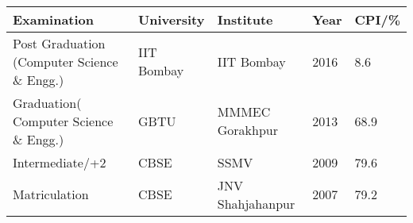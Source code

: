  \hfill \\[-0.1cm]
\indent \begin{tabular}{@{\hskip 0.04in} l @{\hskip 0.40in} l @{\hskip 0.30in} l @{\hskip 0.30in} l @{\hskip 0.27in} l }
	\hline
	\textbf{Examination} & \textbf{University} & \textbf{Institute} & \textbf{Year} & \textbf{CPI/\%} \\
	\hline
	Post Graduation (Computer Science \& Engg.) & IIT Bombay & IIT Bombay & 2016 & 8.6 \\
	Graduation( Computer Science \& Engg.) & GBTU & MMMEC Gorakhpur & 2013 & 68.9\\
	Intermediate/+2 & CBSE & SSMV & 2009 & 79.6\\
	Matriculation & CBSE & JNV Shahjahanpur & 2007& 79.2\\
	\hline
\end{tabular}






